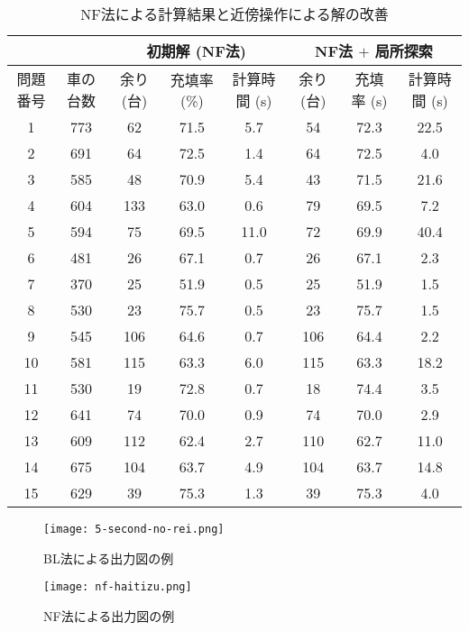 \begin{table}[H]
    \centering
    \caption{NF法による計算結果と近傍操作による解の改善}
    \label{review-local-nf}
    \begin{tabular}{cccccccc}
    \hline
        & & \multicolumn{3}{c}{初期解 (NF法)} & \multicolumn{3}{c}{NF法 $+$ 局所探索} \\
    \hline
    問題番号 & 車の台数  & 余り (台)  & 充填率 (\%) & 計算時間 (s) & 余り (台)  & 充填率 (s)  & 計算時間 (s)  \\
    \hline
    1    & 773  & 62      & 71.5     &  5.7     & 54      & 72.3     & 22.5       \\
    2    & 691  & 64      & 72.5     &  1.4     & 64      & 72.5     & 4.0      \\
    3    & 585  & 48      & 70.9     &  5.4     & 43      & 71.5     & 21.6       \\
    4    & 604  & 133     & 63.0     &  0.6     & 79      & 69.5     & 7.2      \\
    5    & 594  & 75      & 69.5     &  11.0    & 72      & 69.9     & 40.4       \\
    6    & 481  & 26      & 67.1     & 0.7      & 26      & 67.1     & 2.3          \\
    7    & 370  & 25      & 51.9     & 0.5      & 25      & 51.9     & 1.5       \\
    8    & 530  & 23      & 75.7     & 0.5      & 23      & 75.7     & 1.5       \\
    9    & 545  & 106     & 64.6     & 0.7      & 106     & 64.4     & 2.2        \\
    10   & 581  & 115     & 63.3     & 6.0      & 115     & 63.3     & 18.2       \\
    11   & 530  & 19      & 72.8     & 0.7      & 18      & 74.4     & 3.5      \\
    12   & 641  & 74      & 70.0     & 0.9      & 74      & 70.0     & 2.9       \\
    13   & 609  & 112     & 62.4     & 2.7      & 110     & 62.7     & 11.0       \\
    14   & 675  & 104     & 63.7     & 4.9      & 104     & 63.7     & 14.8      \\
    15   & 629  & 39      & 75.3     & 1.3      & 39      & 75.3     & 4.0      \\
    \hline
    \end{tabular}
\end{table}

\clearpage

\begin{figure}[t]
    \texttt{[image: 5-second-no-rei.png]}
    \caption{BL法による出力図の例}
    \label{second-no-rei}
\end{figure}


\begin{figure}[b]
    \texttt{[image: nf-haitizu.png]}
    \caption{NF法による出力図の例}
    \label{nf-norei}
\end{figure}

